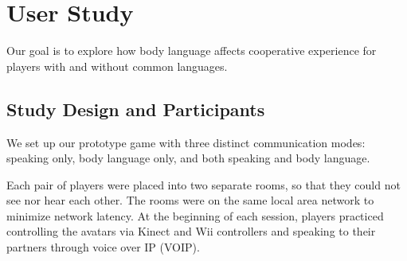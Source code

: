 \section{User Study}

Our goal is to explore how body language affects cooperative experience for players with and without common languages. 

\subsection{Study Design and Participants}
We set up our prototype game with three distinct communication modes: speaking only, body language only, and both speaking and body language. 

%
%

Each pair of players were placed into two separate rooms, so that they could not see nor hear each other. The rooms were on the same local area network to minimize network latency. At the beginning of each session, players practiced controlling the avatars via Kinect and Wii controllers and speaking to their partners through voice over IP (VOIP). 

